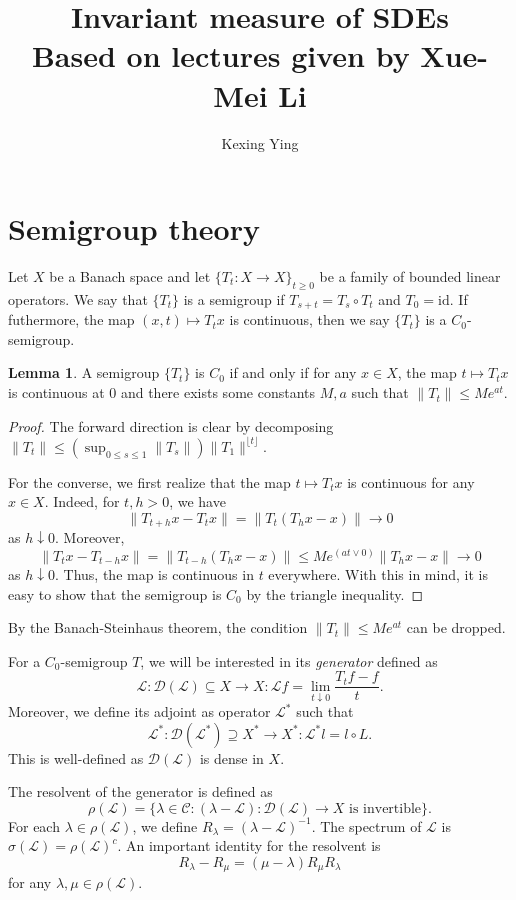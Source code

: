 \documentclass[]{article}
\title{Invariant measure of SDEs\\
  \large Based on lectures given by Xue-Mei Li}
\author{Kexing Ying}
\theoremstyle{definition}
\theoremstyle{definition}
\newtheorem{lemma}{Lemma}
\begin{document}
\maketitle

\section*{Semigroup theory}

Let \(X\) be a Banach space and let \(\{T_t : X \to X\}_{t \ge 0}\) be a family of bounded linear operators. We say 
that \(\{T_t\}\) is a semigroup if \(T_{s + t} = T_s \circ T_t\) and \(T_0 = \text{id}\). If futhermore, 
the map \((x, t) \mapsto T_t x\) is continuous, then we say \(\{T_t\}\) is a \(C_0\)-semigroup.

\begin{lemma}
  A semigroup \(\{T_t\}\) is \(C_0\) if and only if for any \(x \in X\), the map \(t \mapsto T_t x\) is continuous at 
  \(0\) and there exists some constants \(M, a\) such that \(\|T_t\| \le Me^{at}\).
\end{lemma}
\begin{proof}
  The forward direction is clear by decomposing \(\|T_t\| \le (\sup_{0 \le s \le 1}\|T_{s}\|) \|T_1\|^{\lfloor t \rfloor}\).

  For the converse, we first realize that the map \(t \mapsto T_t x\) is continuous for any \(x \in X\). Indeed, 
  for \(t, h > 0\), we have 
  \[\|T_{t + h} x - T_t x\| = \|T_t(T_h x - x)\| \to 0\]
  as \(h \downarrow 0\). Moreover, 
  \[\|T_t x - T_{t - h} x\| = \|T_{t - h}(T_h x - x)\| \le Me^{(at \vee 0)} \|T_h x - x\| \to 0\]
  as \(h \downarrow 0\). Thus, the map is continuous in \(t\) everywhere. With this in mind, it is easy 
  to show that the semigroup is \(C_0\) by the triangle inequality.
\end{proof}

By the Banach-Steinhaus theorem, the condition \(\|T_t\| \le Me^{at}\) can be dropped.

For a \(C_0\)-semigroup \(T\), we will be interested in its \textit{generator} defined as 
\[\mathcal{L} : \mathcal{D}(\mathcal{L}) \subseteq X \to X : \mathcal{L}f = \lim_{t \downarrow 0} \frac{T_t f - f}{t}.\]
Moreover, we define its adjoint as operator \(\mathcal{L}^*\) such that
\[\mathcal{L}^* : \mathcal{D}(\mathcal{L}^*) \supseteq X^* \to X^* : \mathcal{L}^* l = l \circ L.\]
This is well-defined as \(\mathcal{D}(\mathcal{L})\) is dense in \(X\).

The resolvent of the generator is defined as 
\[\rho(\mathcal{L}) = \{\lambda \in \mathcal{C} : (\lambda - \mathcal{L}) : \mathcal{D}(\mathcal{L}) \to X \text{ is invertible}\}.\]
For each \(\lambda \in \rho(\mathcal{L})\), we define \(R_\lambda = (\lambda - \mathcal{L})^{-1}\).
The spectrum of \(\mathcal{L}\) is \(\sigma(\mathcal{L}) = \rho(\mathcal{L})^c\). An important identity 
for the resolvent is
\[R_\lambda - R_\mu = (\mu - \lambda)R_\mu R_\lambda\]
for any \(\lambda, \mu \in \rho(\mathcal{L})\).
\end{document}
